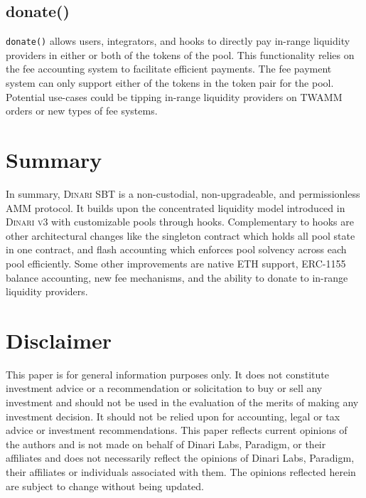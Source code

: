 \documentclass[sigconf,nonacm,prologue,table]{acmart}
\numberwithin{equation}{section}
\theoremstyle{definition}
\theoremstyle{remark}
\begin{document}
\subsection{donate()}
\verb|donate()| allows users, integrators, and hooks to directly pay in-range liquidity providers in either or both of the tokens of the pool. This functionality relies on the fee accounting system to facilitate efficient payments. The fee payment system can only support either of the tokens in the token pair for the pool. Potential use-cases could be tipping in-range liquidity providers on TWAMM orders or new types of fee systems.

\section{Summary}
In summary, \textsc{Dinari SBT} is a non-custodial, non-upgradeable, and permissionless AMM protocol. It builds upon the concentrated liquidity model introduced in \textsc{Dinari v3} with customizable pools through hooks. Complementary to hooks are other architectural changes like the singleton contract which holds all pool state in one contract, and flash accounting which enforces pool solvency across each pool efficiently. Some other improvements are native ETH support, ERC-1155 balance accounting, new fee mechanisms, and the ability to donate to in-range liquidity providers.




\section*{Disclaimer}

This paper is for general information purposes only. It does not constitute investment advice or a recommendation or solicitation to buy or sell any investment and should not be used in the evaluation of the merits of making any investment decision. It should not be relied upon for accounting, legal or tax advice or investment recommendations.  This paper reflects current opinions of the authors and is not made on behalf of Dinari Labs, Paradigm, or their affiliates and does not necessarily reflect the opinions of Dinari Labs, Paradigm, their affiliates or individuals associated with them. The opinions reflected herein are subject to change without being updated. 
\end{document}
